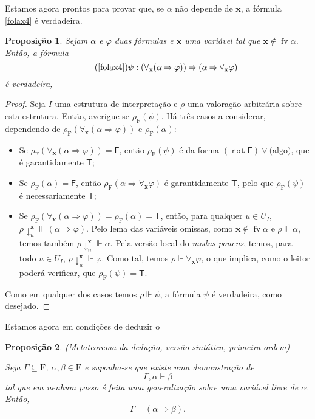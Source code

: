 \documentclass{report}
\newtheorem{prop}{Proposição}
\theoremstyle{definition}
\theoremstyle{remark}
\renewcommand{\bf}[1]{\mathbf{#1}}
\newcommand{\F}{\mathrm{F}}
\newcommand{\lt}{\mathsf{T}}
\newcommand{\lf}{\mathsf{F}}
\DeclareMathOperator{\fv}{fv}
\DeclareMathOperator{\pnot}{\texttt{not}}
\newcommand{\imply}{\mathbin{\Rightarrow}}
\begin{document}
	Estamos agora prontos para provar que, se $\alpha$ não depende de $\bf x$, a fórmula \eqref{folax4} é verdadeira.
	
	\begin{prop}\label{fol:folax4verdadeira}
	Sejam $\alpha$ e $\varphi$ duas fórmulas e $\bf x$ uma variável tal que $\bf x \not \in \fv\alpha$. Então, a fórmula
	\begin{equation}\tag{\ref{folax4}}
	\psi : (\forall_{\bf x} (\alpha \imply \varphi)) \imply (\alpha \imply \forall_{\bf x} \varphi)
	\end{equation}
	é verdadeira,
	\end{prop}
	
	\begin{proof}
	Seja $I$ uma estrutura de interpretação e $\rho$ uma valoração arbitrária sobre esta estrutura. Então, averigue-se $\rho_\F(\psi)$. Há três casos a considerar, dependendo de $\rho_\F(\forall_{\bf x}(\alpha \imply \varphi))$ e $\rho_\F(\alpha)$:
	
	\begin{itemize}
	\item Se $\rho_\F(\forall_{\bf x}(\alpha \imply \varphi)) = \lf$, então $\rho_\F(\psi)$ é da forma $(\pnot \lf) \lor \text{(algo)}$, que é garantidamente $\lt$;
	
	\item Se $\rho_\F(\alpha) = \lf$, então $\rho_\F(\alpha \imply \forall_{\bf x} \varphi)$ é garantidamente $\lt$, pelo que $\rho_\F(\psi)$ é necessariamente $\lt$;
	
	\item Se $\rho_\F(\forall_{\bf x}(\alpha \imply \varphi)) = \rho_\F(\alpha) = \lt$, então, para qualquer $u \in U_I$, $\rho\!\downarrow^{\bf x}_u \Vdash (\alpha \imply \varphi)$. Pelo lema das variáveis omissas, como $\bf x \not \in \fv \alpha$ e $\rho \Vdash \alpha$, temos também $\rho\!\downarrow^{\bf x}_u \Vdash \alpha$. Pela versão local do \emph{modus ponens}, temos, para todo $u \in U_I$, $\rho\!\downarrow^{\bf x}_u \Vdash \varphi$. Como tal, temos $\rho \Vdash \forall_{\bf x} \varphi$, o que implica, como o leitor poderá verificar, que $\rho_\F(\psi) = \lt$.
	\end{itemize}
	
	Como em qualquer dos casos temos $\rho \Vdash \psi$, a fórmula $\psi$ é verdadeira, como desejado.
	\end{proof}
	
	Estamos agora em condições de deduzir o
	
	\begin{prop}
	(Metateorema da dedução, versão sintática, primeira ordem)
	
	Seja $\Gamma \subseteq \F$, $\alpha, \beta \in \F$ e suponha-se que existe uma demonstração de
	\[\Gamma, \alpha \vdash \beta\]
	tal que em nenhum passo é feita uma generalização sobre uma variável livre de $\alpha$. Então,
	\[\Gamma \vdash (\alpha \imply \beta).\]
	\end{prop}
	
\end{document}
